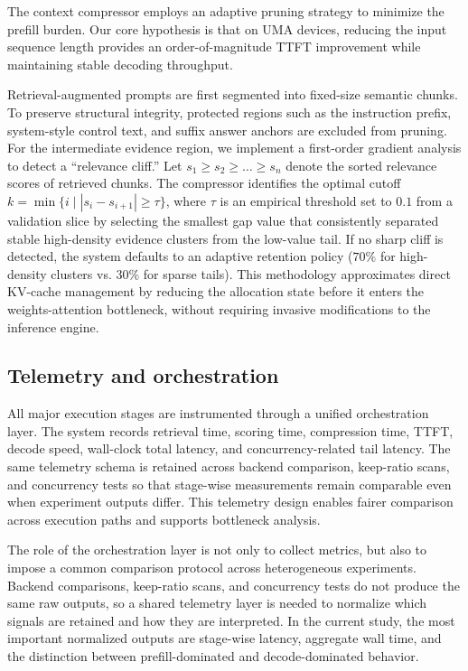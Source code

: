 \documentclass[10pt,twocolumn]{article}
\begin{document}
The context compressor employs an adaptive pruning strategy to minimize the prefill burden. Our core hypothesis is that on UMA devices, reducing the input sequence length provides an order-of-magnitude TTFT improvement while maintaining stable decoding throughput.

Retrieval-augmented prompts are first segmented into fixed-size semantic chunks. To preserve structural integrity, protected regions such as the instruction prefix, system-style control text, and suffix answer anchors are excluded from pruning. For the intermediate evidence region, we implement a first-order gradient analysis to detect a ``relevance cliff.'' Let $s_1 \ge s_2 \ge \dots \ge s_n$ denote the sorted relevance scores of retrieved chunks. The compressor identifies the optimal cutoff $k = \min \{ i \mid |s_i - s_{i+1}| \ge \tau \}$, where $\tau$ is an empirical threshold set to $0.1$ from a validation slice by selecting the smallest gap value that consistently separated stable high-density evidence clusters from the low-value tail. If no sharp cliff is detected, the system defaults to an adaptive retention policy ($70\%$ for high-density clusters vs. $30\%$ for sparse tails). This methodology approximates direct KV-cache management by reducing the allocation state before it enters the weights-attention bottleneck, without requiring invasive modifications to the inference engine.

\subsection{Telemetry and orchestration}

All major execution stages are instrumented through a unified orchestration layer. The system records retrieval time, scoring time, compression time, TTFT, decode speed, wall-clock total latency, and concurrency-related tail latency. The same telemetry schema is retained across backend comparison, keep-ratio scans, and concurrency tests so that stage-wise measurements remain comparable even when experiment outputs differ. This telemetry design enables fairer comparison across execution paths and supports bottleneck analysis.

The role of the orchestration layer is not only to collect metrics, but also to impose a common comparison protocol across heterogeneous experiments. Backend comparisons, keep-ratio scans, and concurrency tests do not produce the same raw outputs, so a shared telemetry layer is needed to normalize which signals are retained and how they are interpreted. In the current study, the most important normalized outputs are stage-wise latency, aggregate wall time, and the distinction between prefill-dominated and decode-dominated behavior.
\end{document}
